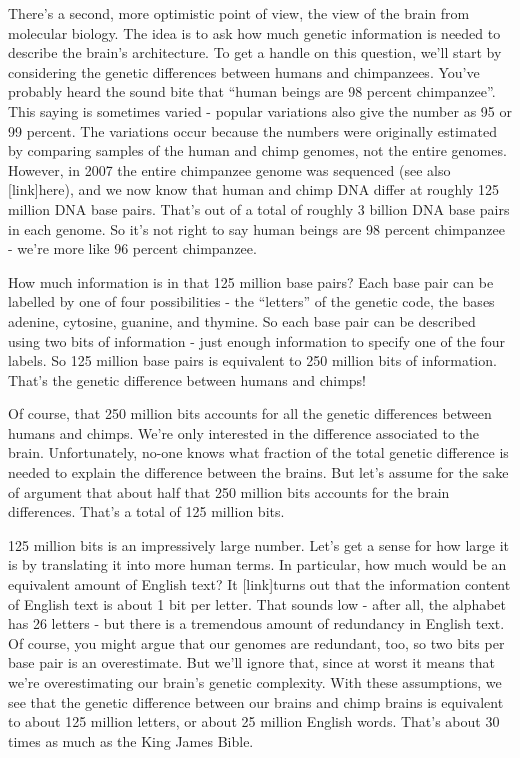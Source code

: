 \documentclass[a4paper,twoside,10pt]{book}
\begin{document}
There's a second, more optimistic point of view, the view of the brain from molecular biology. The idea is to ask how much genetic information is needed to describe the brain's architecture. To get a handle on this question, we'll start by considering the genetic differences between humans and chimpanzees. You've probably heard the sound bite that ``human beings are 98 percent chimpanzee''. This saying is sometimes varied - popular variations also give the number as 95 or 99 percent. The variations occur because the numbers were originally estimated by comparing samples of the human and chimp genomes, not the entire genomes. However, in 2007 the entire chimpanzee genome was sequenced (see also [link]here), and we now know that human and chimp DNA differ at roughly 125 million DNA base pairs. That's out of a total of roughly 3 billion DNA base pairs in each genome. So it's not right to say human beings are 98 percent chimpanzee - we're more like 96 percent chimpanzee.

How much information is in that 125 million base pairs? Each base pair can be labelled by one of four possibilities - the ``letters'' of the genetic code, the bases adenine, cytosine, guanine, and thymine. So each base pair can be described using two bits of information - just enough information to specify one of the four labels. So 125 million base pairs is equivalent to 250 million bits of information. That's the genetic difference between humans and chimps!

Of course, that 250 million bits accounts for all the genetic differences between humans and chimps. We're only interested in the difference associated to the brain. Unfortunately, no-one knows what fraction of the total genetic difference is needed to explain the difference between the brains. But let's assume for the sake of argument that about half that 250 million bits accounts for the brain differences. That's a total of 125 million bits.

125 million bits is an impressively large number. Let's get a sense for how large it is by translating it into more human terms. In particular, how much would be an equivalent amount of English text? It [link]turns out that the information content of English text is about 1 bit per letter. That sounds low - after all, the alphabet has 26 letters - but there is a tremendous amount of redundancy in English text. Of course, you might argue that our genomes are redundant, too, so two bits per base pair is an overestimate. But we'll ignore that, since at worst it means that we're overestimating our brain's genetic complexity. With these assumptions, we see that the genetic difference between our brains and chimp brains is equivalent to about 125 million letters, or about 25 million English words. That's about 30 times as much as the King James Bible.
\end{document}
